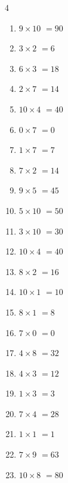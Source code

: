 \begin{multicols}{4}
\begin{enumerate}
  \item $9\times 10$
        $=90$

  \item $3\times 2$
        $=6$

  \item $6\times 3$
        $=18$

  \item $2\times 7$
        $=14$

  \item $10\times 4$
        $=40$

  \item $0\times 7$
        $=0$

  \item $1\times 7$
        $=7$

  \item $7\times 2$
        $=14$

  \item $9\times 5$
        $=45$

  \item $5\times 10$
        $=50$

  \item $3\times 10$
        $=30$

  \item $10\times 4$
        $=40$

  \item $8\times 2$
        $=16$

  \item $10\times 1$
        $=10$

\columnbreak %

  \item $8\times 1$
        $=8$

  \item $7\times 0$
        $=0$

  \item $4\times 8$
        $=32$

  \item $4\times 3$
        $=12$

  \item $1\times 3$
        $=3$

  \item $7\times 4$
        $=28$

  \item $1\times 1$
        $=1$

  \item $7\times 9$
        $=63$

  \item $10\times 8$
        $=80$


\end{enumerate}
\end{multicols}
